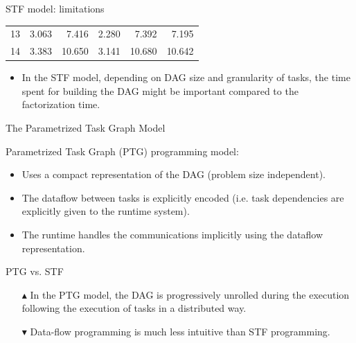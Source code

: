 \documentclass{beamer}
\newcommand{\dg}[1]{\textcolor{mgreen}{#1\xspace}}
\newcommand{\dr}[1]{\textcolor{mred}{#1\xspace}}
\newcommand{\db}[1]{\textcolor{mblue}{#1\xspace}}
\newcommand{\dd}[1]{\textcolor{gray!70}{#1\xspace}}
\begin{document}
\begin{frame}{STF model: limitations}
\begin{center}
{{\begin{tabular}{r|rr|rr|r}
        13 & \dd{3.063}                 & \dd{7.416}                 & \dd{2.280} & \dd{7.392}  & \dd{7.195}  \\
        14 & \dd{3.383}                 & \dd{10.650}                & \dd{3.141} & \dd{10.680} & \dd{10.642} \\
        \hline
    \end{tabular}}}  
  \end{center}
  \begin{itemize}
  \item In the STF model, depending on \alert{DAG size} and
    \alert{granularity} of tasks, the time spent for building the DAG
    might be important compared to the factorization time.
  \end{itemize}
\end{frame}

\begin{frame}{The Parametrized Task Graph Model}
  
  \alert{Parametrized Task Graph} (PTG) programming model:

  \begin{itemize}
  \item Uses a \db{compact representation} of the DAG (problem
    size independent).
  \item The dataflow between tasks is \db{explicitly} encoded
    (i.e. task dependencies are explicitly given to the runtime
    system).
  \item The runtime handles the communications implicitly using the
    dataflow representation.
  \end{itemize}

  \alert{PTG} vs. \alert{STF}

  \begin{itemize}
  \item[\dg{$\blacktriangle$}] In the PTG model, the DAG is
    \alert{progressively} unrolled during the execution following the
    execution of tasks in a distributed way.
  \item[\dr{$\blacktriangledown$}] Data-flow programming is much less
    intuitive than STF programming.
  \end{itemize}

\end{frame}
\end{document}
